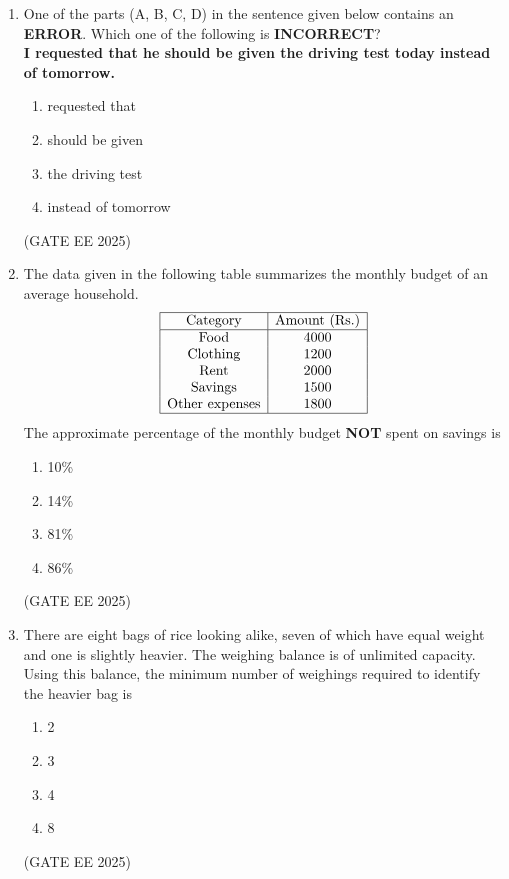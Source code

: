 \documentclass[11pt, letterpaper]{article}
\theoremstyle{remark}
\begin{document}
\begin{enumerate}
\item One of the parts (A, B, C, D) in the sentence given below contains an \textbf{ERROR}. Which one of the following is \textbf{INCORRECT}?\\[0.5em]
\textbf{I requested that he should be given the driving test today instead of tomorrow.}
\begin{multicols}{2}
\begin{enumerate}  
\item requested that
\item should be given
\item the driving test
\item instead of tomorrow
\end{enumerate}
\end{multicols}
\hfill(GATE EE 2025)

\item The data given in the following table summarizes the monthly budget of an average household.
\[
    \begin{array}{|c|c|}
    \hline
    \text{Category} & \text{Amount (Rs.)} \\
    \hline
    \text{Food}        & 4000 \\
    \text{Clothing}    & 1200 \\
    \text{Rent}        & 2000 \\
    \text{Savings}     & 1500 \\
    \text{Other expenses} & 1800 \\
    \hline
    \end{array}
\]
The approximate percentage of the monthly budget \textbf{NOT} spent on savings is
\begin{multicols}{2}
\begin{enumerate}  
\item 10\%
\item 14\%
\item 81\%
\item 86\%
\end{enumerate}
\end{multicols}
\hfill(GATE EE 2025)

\item There are eight bags of rice looking alike, seven of which have equal weight and one is slightly heavier. The weighing balance is of unlimited capacity. Using this balance, the minimum number of weighings required to identify the heavier bag is
\begin{multicols}{2}
\begin{enumerate}  
\item 2
\item 3
\item 4
\item 8
\end{enumerate}
\end{multicols}
\hfill(GATE EE 2025)


\end{enumerate}
\end{document}
